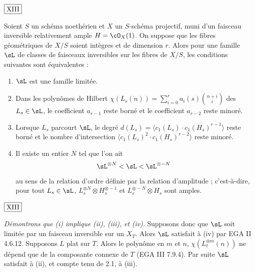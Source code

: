 \begin{flushright}
$\fbox{\text{XIII}}$
\end{flushright}

\begin{thm}\label{thm:3.13} Soient $S$ un schéma noethérien et $X$ un $S$-schéma projectif, muni d'un faisceau inversible relativement ample $H = \cO_X(1)$. On suppose que les fibres géométriques de $X/S$ soient intègres et de dimension $r$. Alors pour une famille $\sL$ de classes de faisceaux inversibles sur les fibres de $X/S$, les conditions suivantes sont équivalentes :
\begin{enumerate}[label={\roman*)}]
\item $\sL$ est une famille limitée.
\item Dans les polynômes de Hilbert $\chi(L_s(n)) = \sum_{i=0}^{r} a_i(s) \binom{n+i}{i}$ des $L_s \in \sL$, le coefficient $a_{r-1}$ reste borné et le coefficient $a_{r-2}$ reste minoré.
\item Lorsque $L_s$ parcourt $\sL$, le degré $d(L_s) = \langle c_1(L_s) \cdot c_1(H_s)^{r-1} \rangle$ reste borné et le nombre d'intersection $\langle c_1(L_s)^2 \cdot c_1(H_s)^{r-2} \rangle$ reste minoré.
\item Il existe un entier $N$ tel que l'on ait
\[
\sL^{\otimes N} < \sL < \sL^{\otimes -N}
\]
au sens de la relation d'ordre définie par la relation d'amplitude ; c'est-à-dire, pour tout $L_s \in \sL$, $L_s^{\otimes N} \otimes H_s^{\otimes -1}$ et $L_s^{\otimes -N} \otimes H_s$ sont amples.
\end{enumerate}
\end{thm}

\begin{flushright}
$\fbox{\text{XIII}}$
\end{flushright}

\noindent\textit{Démontrons que (i) implique (ii), (iii), et (iv).} Supposons donc que $\sL$ soit limitée par un faisceau inversible sur un $X_T$. Alors $\sL$ satisfait à (iv) par EGA II 4.6.12. Supposons $L$ plat sur $T$. Alors le polynôme en $m$ et $n$, $\chi(L_t^{\otimes m}(n))$ ne dépend que de la composante connexe de $T$ (EGA III 7.9.4). Par suite $\sL$ satisfait à (ii), et compte tenu de 2.1, à (iii).

